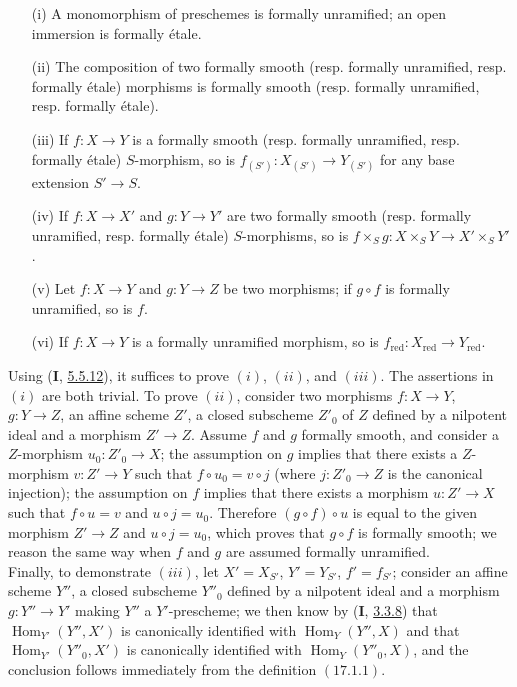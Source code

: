 \begin{proposition}[17.1.3]
\label{IV.17.1.3}
\begin{enumerate}
\item[(i)] A monomorphism of preschemes is formally unramified; an open immersion is formally \'etale.
\item[(ii)] The composition of two formally smooth (resp. formally unramified, resp. formally \'etale) morphisms is formally smooth (resp. formally unramified, resp. formally \'etale).
\item[(iii)] If $f:X\to Y$ is a formally smooth (resp. formally unramified, resp. formally \'etale) $S$-morphism, so is $f_{(S')}:X_{(S')}\to Y_{(S')}$ for any base extension $S'\to S$.
\item[(iv)] If $f: X \to X'$ and $g: Y \to Y'$ are two formally smooth (resp. formally unramified, resp. formally \'etale) $S$-morphisms, so is $f \times_{S} g: X\times_{S} Y \to X' \times_{S} Y'$.
\item[(v)] Let $f : X \to Y$ and $g : Y \to Z$ be two morphisms; if $g \circ f$ is formally unramified, so is $f$.
\item[(vi)] If $f : X \to Y$ is a formally unramified morphism, so is $f_{\mathrm{red}}: X_{\mathrm{red}} \to Y_{\mathrm{red}}$.
\end{enumerate}
\end{proposition}
Using (\textbf{I}, \hyperref[I.5.5.12]{5.5.12}), it suffices to prove $(i)$, $(ii)$, and $(iii)$. The assertions in $(i)$ are both trivial. To prove $(ii)$, consider two morphisms $f: X \to Y$, $g: Y \to Z$, an affine scheme $Z'$, a closed subscheme $Z'_0$ of $Z$ defined by a nilpotent ideal and a morphism $Z' \to Z$. Assume $f$ and $g$ formally smooth, and consider a $Z$-morphism $u_0 : Z'_0 \to X$; the assumption on $g$ implies that there exists a $Z$-morphism $v: Z' \to Y$ such that $f \circ u_0 = v \circ j$ (where $j : Z'_0 \to Z$ is the canonical injection); the assumption on $f$ implies that there exists a morphism $u : Z' \to X$ such that $f \circ u = v$ and $u \circ j = u_0$. Therefore $(g \circ f) \circ u$ is equal to the given morphism $Z' \to Z$ and $u \circ j = u_0$, which proves that $g \circ f$ is formally smooth; we reason the same way when $f$ and $g$ are assumed formally unramified.\\
Finally, to demonstrate $(iii)$, let $X' = X_{S'}$, $Y' = Y_{S'}$, $f' = f_{S'}$; consider an affine scheme $Y''$, a closed subscheme $Y''_0$ defined by a nilpotent ideal and a morphism $g : Y'' \to Y'$ making $Y''$ a $Y'$-prescheme; we then know by (\textbf{I}, \hyperref[I.3.3.8]{3.3.8}) that $\operatorname{Hom}_{Y'}(Y'', X')$ is canonically identified with $\operatorname{Hom}_{Y}(Y'', X)$ and that $\operatorname{Hom}_{Y'}(Y''_0, X')$ is canonically identified with $\operatorname{Hom}_{Y}(Y''_0, X)$, and the conclusion follows immediately from the definition $(\hyperref[IV.17.1.1]{17.1.1})$.\\
